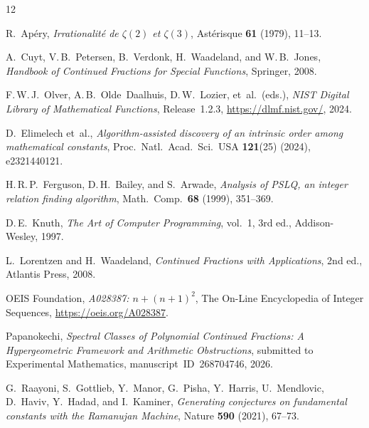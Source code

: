 \documentclass[11pt,a4paper]{article}
\theoremstyle{plain}
\theoremstyle{definition}
\theoremstyle{remark}
\begin{document}
\begin{thebibliography}{12}

R.~Ap\'ery,
\textit{Irrationalit\'e de $\zeta(2)$ et $\zeta(3)$},
Ast\'erisque \textbf{61} (1979), 11--13.

A.~Cuyt, V.\,B.~Petersen, B.~Verdonk, H.~Waadeland,
and W.\,B.~Jones,
\emph{Handbook of Continued Fractions for Special Functions},
Springer, 2008.

F.\,W.\,J.~Olver, A.\,B.~Olde~Daalhuis, D.\,W.~Lozier,
et~al.\ (eds.),
\emph{NIST Digital Library of Mathematical Functions},
Release~1.2.3, \url{https://dlmf.nist.gov/}, 2024.

D.~Elimelech et~al.,
\textit{Algorithm-assisted discovery of an intrinsic order among
mathematical constants},
Proc.\ Natl.\ Acad.\ Sci.\ USA \textbf{121}(25) (2024),
e2321440121.

H.\,R.\,P.~Ferguson, D.\,H.~Bailey, and S.~Arwade,
\textit{Analysis of PSLQ, an integer relation finding algorithm},
Math.\ Comp.\ \textbf{68} (1999), 351--369.

D.\,E.~Knuth,
\emph{The Art of Computer Programming},
vol.~1, 3rd ed., Addison-Wesley, 1997.

L.~Lorentzen and H.~Waadeland,
\emph{Continued Fractions with Applications},
2nd ed., Atlantis Press, 2008.

{OEIS Foundation},
\textit{A028387: $n + (n{+}1)^2$},
The On-Line Encyclopedia of Integer Sequences,
\url{https://oeis.org/A028387}.

Papanokechi,
\textit{Spectral Classes of Polynomial Continued Fractions:
A Hypergeometric Framework and Arithmetic Obstructions},
submitted to Experimental Mathematics,
manuscript~ID~268704746, 2026.

G.~Raayoni, S.~Gottlieb, Y.~Manor, G.~Pisha, Y.~Harris,
U.~Mendlovic, D.~Haviv, Y.~Hadad, and I.~Kaminer,
\textit{Generating conjectures on fundamental constants with the
Ramanujan Machine},
Nature \textbf{590} (2021), 67--73.


\end{thebibliography}
\end{document}
